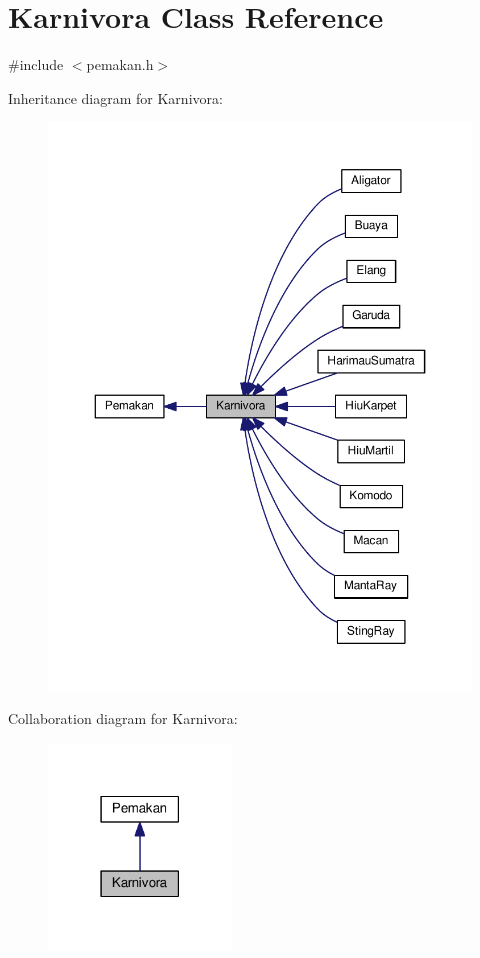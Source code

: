 \hypertarget{classKarnivora}{}\section{Karnivora Class Reference}
\label{classKarnivora}


{\ttfamily \#include $<$pemakan.\+h$>$}



Inheritance diagram for Karnivora\+:
\nopagebreak
\begin{figure}[H]
\begin{center}
\leavevmode
\includegraphics[width=350pt]{classKarnivora__inherit__graph}
\end{center}
\end{figure}


Collaboration diagram for Karnivora\+:
\nopagebreak
\begin{figure}[H]
\begin{center}
\leavevmode
\includegraphics[width=138pt]{classKarnivora__coll__graph}
\end{center}
\end{figure}
